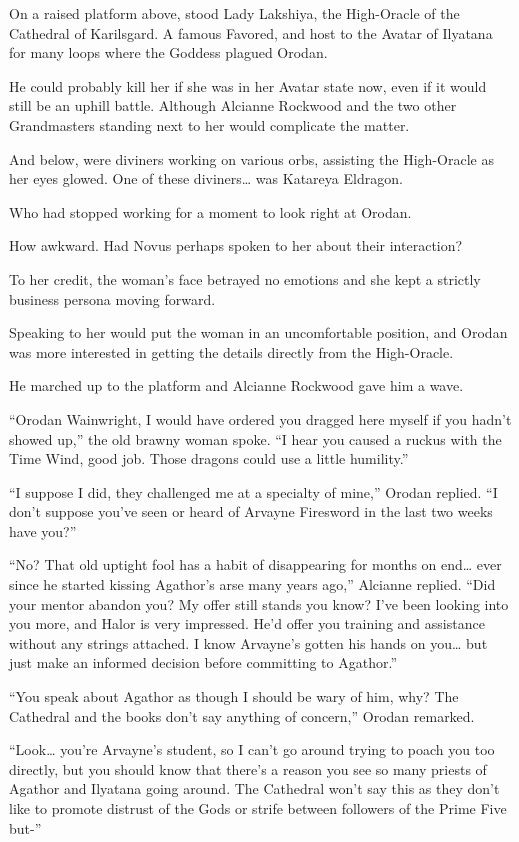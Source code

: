 \documentclass[a4paper,10pt]{book}
\begin{document}
On a raised platform above, stood Lady Lakshiya, the High-Oracle of the Cathedral of Karilsgard. A famous Favored, and host to the Avatar of Ilyatana for many loops where the Goddess plagued Orodan.\par
He could probably kill her if she was in her Avatar state now, even if it would still be an uphill battle. Although Alcianne Rockwood and the two other Grandmasters standing next to her would complicate the matter.\par
And below, were diviners working on various orbs, assisting the High-Oracle as her eyes glowed. One of these diviners… was Katareya Eldragon.\par
Who had stopped working for a moment to look right at Orodan.\par
How awkward. Had Novus perhaps spoken to her about their interaction?\par
To her credit, the woman’s face betrayed no emotions and she kept a strictly business persona moving forward.\par
Speaking to her would put the woman in an uncomfortable position, and Orodan was more interested in getting the details directly from the High-Oracle.\par
He marched up to the platform and Alcianne Rockwood gave him a wave.\par
“Orodan Wainwright, I would have ordered you dragged here myself if you hadn’t showed up,” the old brawny woman spoke. “I hear you caused a ruckus with the Time Wind, good job. Those dragons could use a little humility.”\par
“I suppose I did, they challenged me at a specialty of mine,” Orodan replied. “I don’t suppose you’ve seen or heard of Arvayne Firesword in the last two weeks have you?”\par
“No? That old uptight fool has a habit of disappearing for months on end… ever since he started kissing Agathor’s arse many years ago,” Alcianne replied. “Did your mentor abandon you? My offer still stands you know? I’ve been looking into you more, and Halor is very impressed. He’d offer you training and assistance without any strings attached. I know Arvayne’s gotten his hands on you… but just make an informed decision before committing to Agathor.”\par
“You speak about Agathor as though I should be wary of him, why? The Cathedral and the books don’t say anything of concern,” Orodan remarked.\par
“Look… you’re Arvayne’s student, so I can’t go around trying to poach you too directly, but you should know that there’s a reason you see so many priests of Agathor and Ilyatana going around. The Cathedral won’t say this as they don’t like to promote distrust of the Gods or strife between followers of the Prime Five but-”\par
\end{document}
